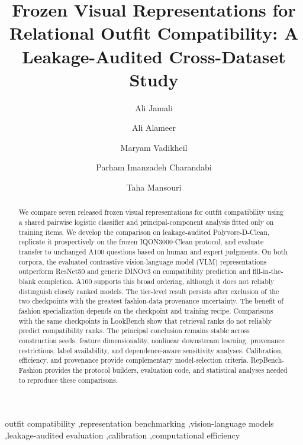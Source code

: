 \documentclass[preprint,12pt]{elsarticle}
\begin{document}
\begin{frontmatter}

\title{Frozen Visual Representations for Relational Outfit Compatibility: A Leakage-Audited Cross-Dataset Study}

\author[salford]{Ali Jamali}
\author[salford]{Ali Alameer}
\author[salford]{Maryam Vadikheil}
\author[salford]{Parham Imanzadeh Charandabi}
\author[salford]{Taha Mansouri}

\begin{abstract}
We compare seven released frozen visual representations for outfit compatibility using a shared pairwise logistic classifier and principal-component analysis fitted only on training items. We develop the comparison on leakage-audited Polyvore-D-Clean, replicate it prospectively on the frozen IQON3000-Clean protocol, and evaluate transfer to unchanged A100 questions based on human and expert judgments. On both corpora, the evaluated contrastive vision-language model (VLM) representations outperform ResNet50 and generic DINOv3 on compatibility prediction and fill-in-the-blank completion. A100 supports this broad ordering, although it does not reliably distinguish closely ranked models. The tier-level result persists after exclusion of the two checkpoints with the greatest fashion-data provenance uncertainty. The benefit of fashion specialization depends on the checkpoint and training recipe. Comparisons with the same checkpoints in LookBench show that retrieval ranks do not reliably predict compatibility ranks. The principal conclusion remains stable across construction seeds, feature dimensionality, nonlinear downstream learning, provenance restrictions, label availability, and dependence-aware sensitivity analyses. Calibration, efficiency, and provenance provide complementary model-selection criteria. RepBench-Fashion provides the protocol builders, evaluation code, and statistical analyses needed to reproduce these comparisons.
\end{abstract}

\begin{keyword}
outfit compatibility \sep representation benchmarking \sep vision-language models \sep leakage-audited evaluation \sep calibration \sep computational efficiency
\end{keyword}

\end{frontmatter}
\end{document}
